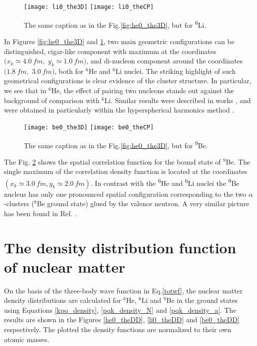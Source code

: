 \documentclass[
12pt, %
oneside, %
english, %
onehalfspacing, %
onehalfspacing, %
headsepline, %
]{MastersDoctoralThesis} %
\newcommand{\he}{\textsuperscript{6}He\xspace}
\newcommand{\li}{\textsuperscript{6}Li\xspace}
\newcommand{\be}{\textsuperscript{9}Be\xspace}
\begin{document}
\begin{figure}[bp]
\centering
\texttt{[image: li0\_the3D]}
\texttt{[image: li0\_theCP]}
\decoRule
\caption{ \footnotesize The same caption as in the Fig.\ref{fig:he0_the3D}, but for \li.}
\label{fig:li0_the3D}
\end{figure} 

In Figures \ref{fig:he0_the3D} and \ref{fig:li0_the3D}, two main geometric configurations can be distinguished, cigar-like component with maximum at the coordinates $(x_k \simeq 4.0~ fm,$ $y_k \simeq 1.0~ fm)$, and di-nucleon component around the coordinates $(1.8~ fm,$ $3.0~ fm)$, both for $^6$He and  $^6$Li nuclei. 
The striking highlight of such geometrical configurations is clear evidence of the cluster structure. 
In particular, we see that in $^6$He, the effect of pairing two nucleons stands out against the background of comparison with $^6$Li. 
Similar results were described in works \cite{kukulin1977stochastic, papadimitriou2011charge}, and were obtained in particularly within the hyperspherical harmonics method \cite{zhukov1993bound}. 

\begin{figure}[tp]
\centering
\texttt{[image: be0\_the3D]}
\texttt{[image: be0\_theCP]}
\decoRule
\caption{ \footnotesize The same caption as in the Fig.\ref{fig:he0_the3D}, but for \be.}
\label{fig:be0_the3D}
\end{figure} 


The Fig. \ref{fig:be0_the3D} shows the spatial correlation function for the bound state of $^9$Be. 
The single maximum of the correlation density function is located at the coordinates $(x_k \simeq 3.0 ~fm, y_k \simeq 2.0~ fm)$. 
In contrast with the \he and \li nuclei the \be nucleus has only one pronounced spatial configuration corresponding to the two $\alpha$-clusters ($^8$Be ground state) glued by the valence neutron. A very similar picture has been found in Ref. \cite{hussein2015low}. 

\section{The density distribution function of nuclear matter}
On the basis of the three-body wave function in Eq.\ref{totwf}, the nuclear matter density distributions are calculated for $^6$He, $^6$Li and $^9$Be in the ground states using Equations \ref{kpq_density}, \ref{pqk_density_N} and \ref{pqk_density_a}. The results are shown in the Figures \ref{he0_theDD}, \ref{li0_theDD} and \ref{be0_theDD} respectively.
The plotted the density functions are normalized to their own atomic masses. 
\end{document}
